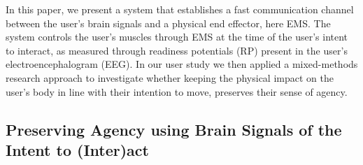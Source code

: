 In this paper, we present a system that establishes a fast communication channel between the user's brain signals and a physical end effector, here EMS. The system controls the user's muscles through EMS at the time of the user's intent to interact, as measured through readiness potentials (RP) present in the user's electroencephalogram (EEG). In our user study we then applied a mixed-methods research approach to investigate whether keeping the physical impact on the user's body in line with their intention to move, preserves their sense of agency.

\subsection{Preserving Agency using Brain Signals of the Intent to (Inter)act}

